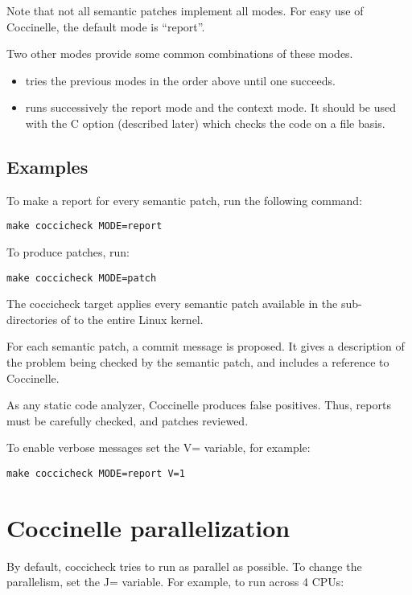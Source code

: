 \documentclass[a4paper,8pt,english]{sphinxmanual}
\begin{document}
Note that not all semantic patches implement all modes. For easy use
of Coccinelle, the default mode is ``report''.

Two other modes provide some common combinations of these modes.
\begin{itemize}
\item {} 
 tries the previous modes in the order above until one succeeds.

\item {} 
 runs successively the report mode and the context mode.
It should be used with the C option (described later)
which checks the code on a file basis.

\end{itemize}


\subsection{Examples}
\label{dev-tools/coccinelle:examples}
To make a report for every semantic patch, run the following command:

\begin{Verbatim}[commandchars=\\\{\}]
make coccicheck MODE=report
\end{Verbatim}

To produce patches, run:

\begin{Verbatim}[commandchars=\\\{\}]
make coccicheck MODE=patch
\end{Verbatim}

The coccicheck target applies every semantic patch available in the
sub-directories of  to the entire Linux kernel.

For each semantic patch, a commit message is proposed.  It gives a
description of the problem being checked by the semantic patch, and
includes a reference to Coccinelle.

As any static code analyzer, Coccinelle produces false
positives. Thus, reports must be carefully checked, and patches
reviewed.

To enable verbose messages set the V= variable, for example:

\begin{Verbatim}[commandchars=\\\{\}]
make coccicheck MODE=report V=1
\end{Verbatim}


\section{Coccinelle parallelization}
\label{dev-tools/coccinelle:coccinelle-parallelization}
By default, coccicheck tries to run as parallel as possible. To change
the parallelism, set the J= variable. For example, to run across 4 CPUs:
\end{document}
